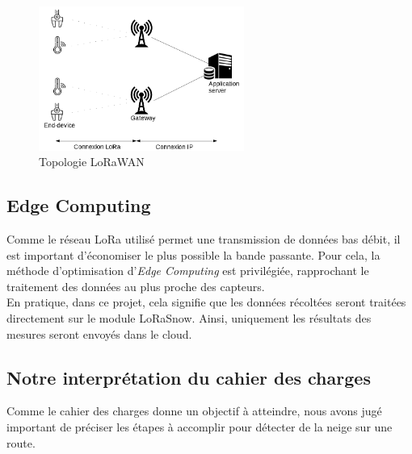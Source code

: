 \begin{figure}[H]
    \centering
    \includegraphics[width=0.6\textwidth]{Images/Illustration/Architecture_lorawan.png}
    \caption[]{Topologie LoRaWAN\footnotemark[1]}
    \label{fig:LoRaWANTopo}
\end{figure}


\subsection{Edge Computing}

Comme le réseau LoRa utilisé permet une transmission de données bas débit, il est important d'économiser
le plus possible la bande passante. Pour cela, la méthode d'optimisation d'\emph{Edge Computing} est
privilégiée, rapprochant le traitement des données au plus proche des capteurs.\\
En pratique, dans ce projet, cela signifie que les données récoltées seront traitées directement sur 
le module LoRaSnow. Ainsi, uniquement les résultats des mesures seront envoyés dans le cloud.
\newpage

\subsection{Notre interprétation du cahier des charges}
Comme le cahier des charges donne un objectif à atteindre, nous avons jugé important de préciser les 
étapes à accomplir pour détecter de la neige sur une route.

